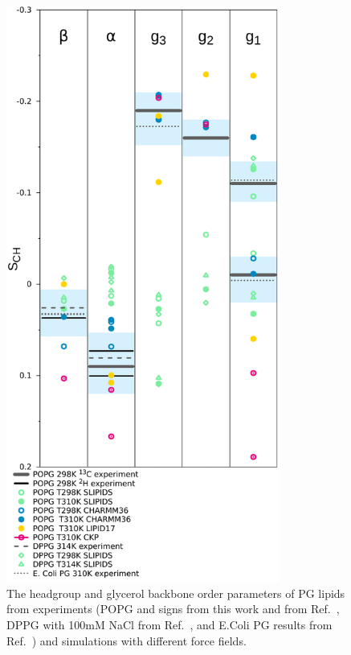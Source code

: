 \documentclass[journal=jpcbfk]{achemso}
\begin{document}
\begin{figure}[!h]
  \centering
  \includegraphics[width=9.0cm]{./Figs/HGorderparametersPG.pdf}
  \caption{\label{HGorderParametersPOPG}
    The headgroup and glycerol backbone order parameters of PG lipids
    from experiments (POPG and signs from this work and from Ref.~, %
    DPPG with 100mM NaCl from Ref.~,%
    and E.Coli PG results from Ref.~)
    and simulations with different force fields.
  }
\end{figure}

\clearpage
\end{document}
